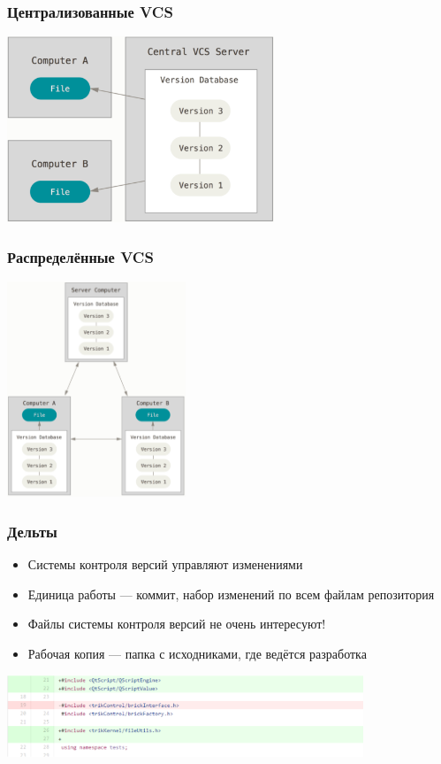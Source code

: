 \documentclass{../../slides-style}
\begin{document}
    \begin{frame}
        \frametitle{Централизованные VCS}
        \begin{center}
            \includegraphics[width=0.6\textwidth]{centralizedVcs.png}
        \end{center}
    \end{frame}

    \begin{frame}
        \frametitle{Распределённые VCS}
        \begin{center}
            \includegraphics[width=0.4\textwidth]{distributedVcs.png}
        \end{center}
    \end{frame}

    \begin{frame}
        \frametitle{Дельты}
        \begin{itemize}
            \item Системы контроля версий управляют изменениями
            \item Единица работы --- коммит, набор изменений по всем файлам репозитория
            \item Файлы системы контроля версий не очень интересуют!
            \item Рабочая копия --- папка с исходниками, где ведётся разработка
        \end{itemize}
        \begin{center}
            \includegraphics[width=0.8\textwidth]{delta.png}
        \end{center}
    \end{frame}
\end{document}
